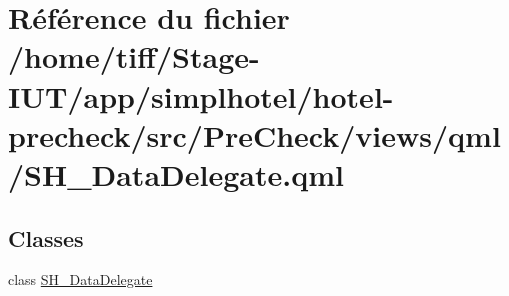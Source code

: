 \hypertarget{SH__DataDelegate_8qml}{\section{Référence du fichier /home/tiff/\-Stage-\/\-I\-U\-T/app/simplhotel/hotel-\/precheck/src/\-Pre\-Check/views/qml/\-S\-H\-\_\-\-Data\-Delegate.qml}
\label{SH__DataDelegate_8qml}
}
\subsection*{Classes}
\begin{DoxyCompactItemize}
\item 
class \hyperlink{classSH__DataDelegate}{S\-H\-\_\-\-Data\-Delegate}
\end{DoxyCompactItemize}
